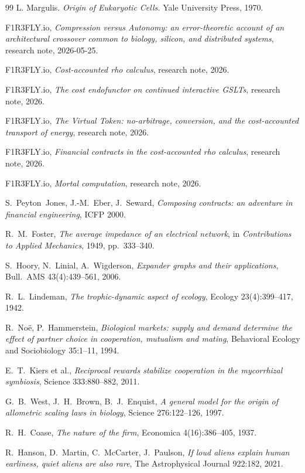 \begin{thebibliography}{99}
L. Margulis. \emph{Origin of Eukaryotic Cells.} Yale University Press, 1970.

F1R3FLY.io, \emph{Compression versus Autonomy: an error-theoretic account of an architectural crossover common to biology, silicon, and distributed systems}, research note, 2026-05-25.

F1R3FLY.io, \emph{Cost-accounted rho calculus}, research note, 2026.

F1R3FLY.io, \emph{The cost endofunctor on continued interactive GSLTs}, research note, 2026.

F1R3FLY.io, \emph{The Virtual Token: no-arbitrage, conversion, and the cost-accounted transport of energy}, research note, 2026.

F1R3FLY.io, \emph{Financial contracts in the cost-accounted rho calculus}, research note, 2026.

F1R3FLY.io, \emph{Mortal computation}, research note, 2026.

S.~Peyton~Jones, J.-M.~Eber, J.~Seward, \emph{Composing contracts: an adventure in financial engineering}, ICFP 2000.

R.~M.~Foster, \emph{The average impedance of an electrical network}, in \emph{Contributions to Applied Mechanics}, 1949, pp.~333--340.

S.~Hoory, N.~Linial, A.~Wigderson, \emph{Expander graphs and their applications}, Bull.\ AMS 43(4):439--561, 2006.

R.~L.~Lindeman, \emph{The trophic-dynamic aspect of ecology}, Ecology 23(4):399--417, 1942.

R.~No\"e, P.~Hammerstein, \emph{Biological markets: supply and demand determine the effect of partner choice in cooperation, mutualism and mating}, Behavioral Ecology and Sociobiology 35:1--11, 1994.

E.~T.~Kiers et al., \emph{Reciprocal rewards stabilize cooperation in the mycorrhizal symbiosis}, Science 333:880--882, 2011.

G.~B.~West, J.~H.~Brown, B.~J.~Enquist, \emph{A general model for the origin of allometric scaling laws in biology}, Science 276:122--126, 1997.

R.~H.~Coase, \emph{The nature of the firm}, Economica 4(16):386--405, 1937.

R.~Hanson, D.~Martin, C.~McCarter, J.~Paulson, \emph{If loud aliens explain human earliness, quiet aliens are also rare}, The Astrophysical Journal 922:182, 2021.



\end{thebibliography}
